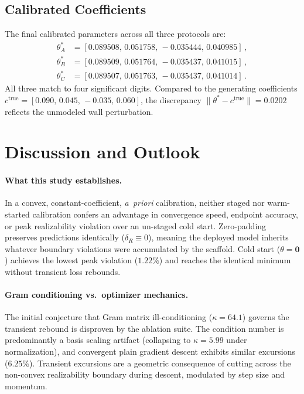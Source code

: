 \documentclass[preprint,aps,prb,longbibliography,superscriptaddress]{revtex4-2}
\begin{document}
\subsection{Calibrated Coefficients}\label{sec:coefficients}

The final calibrated parameters across all three protocols are:
\begin{align}
  \theta_A^* &= [0.089508,\, 0.051758,\, {-}0.035444,\, 0.040985]\,, \\
  \theta_B^* &= [0.089509,\, 0.051764,\, {-}0.035437,\, 0.041015]\,, \\
  \theta_C^* &= [0.089507,\, 0.051763,\, {-}0.035437,\, 0.041014]\,.
\end{align}
All three match to four significant digits. Compared to the generating
coefficients $c^{\mathrm{true}} = [0.090,\, 0.045,\, {-}0.035,\, 0.060]$, the
discrepancy $\|\theta^* - c^{\mathrm{true}}\| = 0.0202$ reflects the unmodeled
wall perturbation.

\section{Discussion and Outlook}\label{sec:discussion}

\paragraph{What this study establishes.}
In a convex, constant-coefficient, \emph{a~priori} calibration, neither staged
nor warm-started calibration confers an advantage in convergence speed, endpoint
accuracy, or peak realizability violation over an un-staged cold start. Zero-padding
preserves predictions identically ($\delta_R \equiv 0$), meaning the deployed
model inherits whatever boundary violations were accumulated by the scaffold.
Cold start ($\theta = \mathbf{0}$) achieves the lowest peak violation ($1.22\%$)
and reaches the identical minimum without transient loss rebounds.

\paragraph{Gram conditioning vs.\ optimizer mechanics.}
The initial conjecture that Gram matrix ill-conditioning ($\kappa = 64.1$)
governs the transient rebound is disproven by the ablation suite. The condition
number is predominantly a basis scaling artifact (collapsing to $\kappa = 5.99$
under normalization), and convergent plain gradient descent exhibits similar
excursions ($6.25\%$). Transient excursions are a geometric consequence of
cutting across the non-convex realizability boundary during descent, modulated
by step size and momentum.
\end{document}
